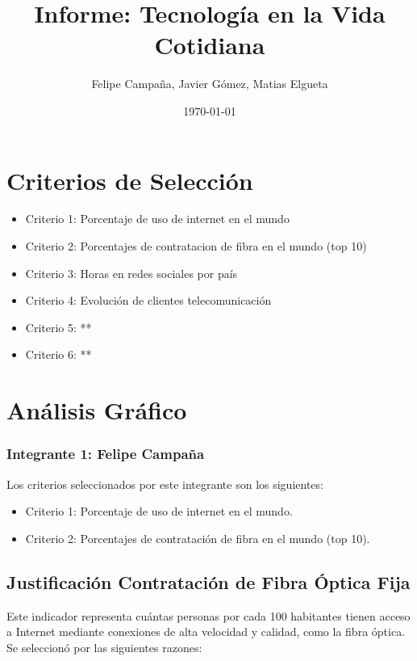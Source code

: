 \documentclass[12pt, a4paper]{article}
\title{Informe: Tecnología en la Vida Cotidiana}
\author{Felipe Campaña, Javier Gómez, Matias Elgueta}
\date{\today\\[2cm]
}
\begin{document}
\maketitle

\section*{Criterios de Selección}
\begin{itemize}
    \item Criterio 1: Porcentaje de uso de internet en el mundo
    \item Criterio 2: Porcentajes de contratacion de fibra en el mundo (top 10)
    \item Criterio 3: Horas en redes sociales por país
    \item Criterio 4: Evolución de clientes telecomunicación
    \item Criterio 5: **
    \item Criterio 6: **
\end{itemize}

\section*{Análisis Gráfico}



\subsubsection*{Integrante 1: Felipe Campaña}
Los criterios seleccionados por este integrante son los siguientes:
\begin{itemize}
    \item Criterio 1: Porcentaje de uso de internet en el mundo.
    \item Criterio 2: Porcentajes de contratación de fibra en el mundo (top 10).
\end{itemize}

\subsection{Justificación Contratación de Fibra Óptica Fija}

Este indicador representa cuántas personas por cada 100 habitantes tienen acceso a Internet mediante conexiones de alta velocidad y calidad, como la fibra óptica. Se seleccionó por las siguientes razones:
\end{document}
